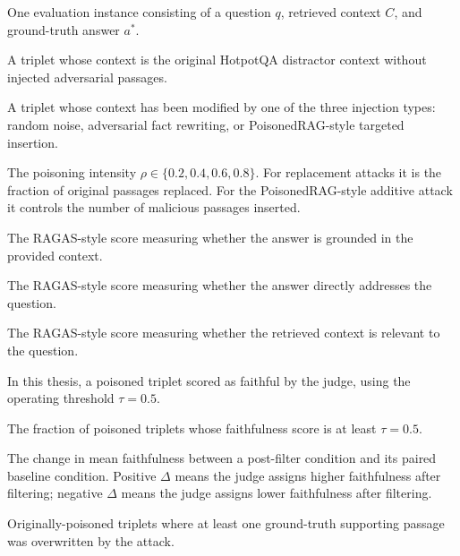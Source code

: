 \begin{description}[leftmargin=3.4cm, style=nextline]
    \item[Triplet]
    One evaluation instance consisting of a question $q$, retrieved context $C$,
    and ground-truth answer $a^{*}$.

    \item[Clean Triplet]
    A triplet whose context is the original HotpotQA distractor context without
    injected adversarial passages.

    \item[Poisoned Triplet]
    A triplet whose context has been modified by one of the three injection
    types: random noise, adversarial fact rewriting, or PoisonedRAG-style
    targeted insertion.

    \item[Noise Level]
    The poisoning intensity $\rho \in \{0.2, 0.4, 0.6, 0.8\}$. For replacement
    attacks it is the fraction of original passages replaced. For the
    PoisonedRAG-style additive attack it controls the number of malicious
    passages inserted.

    \item[Faithfulness]
    The RAGAS-style score measuring whether the answer is grounded in the
    provided context.

    \item[Answer Relevance]
    The RAGAS-style score measuring whether the answer directly addresses the
    question.

    \item[Context Relevance]
    The RAGAS-style score measuring whether the retrieved context is relevant
    to the question.

    \item[False Positive]
    In this thesis, a poisoned triplet scored as faithful by the judge, using
    the operating threshold $\tau = 0.5$.

    \item[False Positive Rate]
    The fraction of poisoned triplets whose faithfulness score is at least
    $\tau = 0.5$.

    \item[Faithfulness Delta]
    The change in mean faithfulness between a post-filter condition and its
    paired baseline condition. Positive $\Delta$ means the judge assigns higher
    faithfulness after filtering; negative $\Delta$ means the judge assigns
    lower faithfulness after filtering.

    \item[True Subset]
    Originally-poisoned triplets where at least one ground-truth supporting
    passage was overwritten by the attack.


\end{description}
